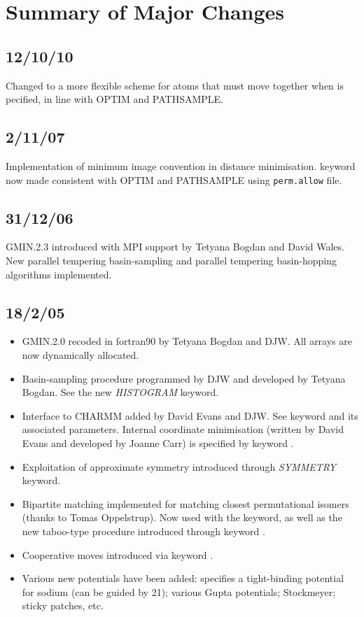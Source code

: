 \section{Summary of Major Changes}

\subsection{12/10/10}
Changed to a more flexible scheme for atoms that must move together when
{\/} is pecified, in line with OPTIM and PATHSAMPLE.

\subsection{2/11/07}
Implementation of minimum image convention in distance minimisation.
{} keyword now made consistent with OPTIM and PATHSAMPLE
using {\tt perm.allow} file.

\subsection{31/12/06}
GMIN.2.3 introduced with MPI support by Tetyana Bogdan and David Wales.
New parallel tempering basin-sampling and
parallel tempering basin-hopping algorithms implemented.

\subsection{18/2/05}
\begin{itemize}
\item GMIN.2.0 recoded in fortran90 by Tetyana Bogdan and DJW. All arrays are now dynamically allocated.
\item Basin-sampling procedure programmed by DJW and developed by Tetyana Bogdan. See the new
{\it HISTOGRAM} keyword.
\item Interface to CHARMM added by David Evans and DJW. See keyword {} and its associated 
parameters. Internal coordinate minimisation (written by David Evans and developed by Joanne Carr) 
is specified by keyword {}.
\item Exploitation of approximate symmetry introduced through {\it SYMMETRY} keyword.
\item Bipartite matching implemented for matching closest permutational isomers
(thanks to Tomas Oppelstrup). Now used with 
the {} keyword, as well as the new taboo-type procedure introduced through keyword {}.
\item Cooperative moves introduced via keyword {}.
\item Various new potentials have been added: {} specifies a tight-binding potential
for sodium (can be guided by { 21}); various Gupta potentials; Stockmeyer; sticky patches, etc.
\end{itemize}

